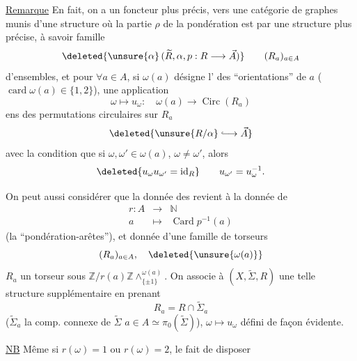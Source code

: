 
\uline{Remarque} En fait, on a un foncteur plus précis, vers une catégorie de graphes munis d'une structure où la partie $\rho$ de la pondération est   par une structure plus précise, à savoir   famille
\[
 \deleted{\unsure{\alpha}\,(\widetilde R,\alpha,p:R\longrightarrow\vec A)}
 \qquad (R_a)_{a\in A}
\]
d'ensembles, et pour $\forall a\in A$, si $\omega(a)$ désigne l' des
``orientations'' de $a$ ($\operatorname{card}\omega(a)\in\{1,2\}$), une application
\[
 \omega\longmapsto u_\omega:\quad \omega(a)\longrightarrow\operatorname{Circ}(R_a)
\]
ens des permutations circulaires sur $R_a$
\[
 \deleted{\unsure{R/\alpha}\lhook\joinrel\longrightarrow\vec A}
\]
avec la condition que si $\omega,\omega'\in\omega(a)$, $\omega\ne\omega'$, alors
\[
 \deleted{u_\omega u_{\omega'}=\operatorname{id}_R}
 \qquad u_{\omega'}=u_\omega^{-1}.
\]

On peut aussi considérer que la donnée des  revient à la donnée de
\[
 \begin{array}{rcl}
 r:A&\longrightarrow&\mathbb N\\
 a&\longmapsto&\operatorname{Card}p^{-1}(a)
 \end{array}
\]
(la ``pondération-arêtes''), et  donnée d'une famille de torseurs
\[
 (R_a)_{a\in A},\quad \deleted{\unsure{\omega(a)}}
\]
$R_a$ un torseur sous $\mathbb Z/r(a)\mathbb Z\mathbin{\wedge}^{\omega(a)}_{\{\pm1\}}$.
On associe à $(X,\widetilde\Sigma,R)$ une telle structure supplémentaire en prenant
\[
 R_a=R\cap\widetilde\Sigma_a
\]
($\widetilde\Sigma_a$ la comp. connexe de $\widetilde\Sigma$   $a\in A\simeq\pi_0(\widetilde\Sigma)$),
$\omega\longmapsto u_\omega$ défini de façon évidente.

\uline{NB} Même si $r(\omega)=1$ ou $r(\omega)=2$, le fait de disposer

